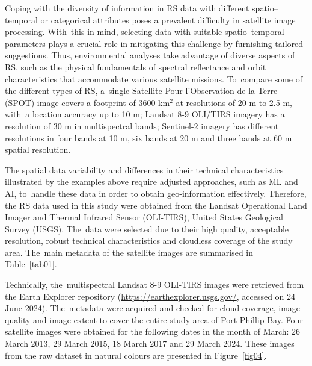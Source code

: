 \documentclass[jmse,article,accept,pdftex,oneauthor]{Definitions/mdpi}
\begin{document}
{Coping with the diversity of information in RS data with different spatio--temporal or categorical attributes poses a prevalent difficulty in satellite image processing. With~this in mind, selecting data with suitable spatio--temporal parameters plays a crucial role in mitigating this challenge by furnishing tailored suggestions. Thus, environmental analyses take advantage of diverse aspects of RS, such as the physical fundamentals of spectral reflectance and orbit characteristics that accommodate %
	various satellite missions. To~compare some of the different types of RS, %
	a~single %
	Satellite Pour l'Observation de la Terre (SPOT) image covers a footprint of} 3600 km$^2$ {at resolutions of 20 m to 2.5 m, with~a location accuracy up to 10 m; Landsat 8-9 OLI/TIRS imagery has a resolution of 30 m in multispectral bands; Sentinel-2 imagery has different resolutions in four bands at 10 m, six bands at 20 m and three bands at 60 m spatial resolution. }

{The spatial data variability and differences in their technical characteristics illustrated by the examples above require adjusted approaches, such as ML and AI, to~handle these data in order to obtain geo-information effectively. Therefore, }the RS data {used in this study }were obtained from the %
Landsat Operational Land Imager and Thermal Infrared Sensor (OLI-TIRS), United States Geological Survey (USGS){. The~data were selected due to their high quality, acceptable resolution, robust technical characteristics and cloudless coverage of the study area}. The~main metadata of the satellite images are summarised in Table~\ref{tab01}. 

Technically, the~multispectral Landsat 8-9 OLI-TIRS images were retrieved from the Earth Explorer repository (\href{https://earthexplorer.usgs.gov/}{https://earthexplorer.usgs.gov/}, accessed on 24 June 2024). The~metadata were acquired and checked for cloud coverage, image quality and image extent to cover the entire study area of Port Phillip Bay. Four satellite images were obtained for the following dates in {the month of }March: 26 March 2013, 29 March 2015, 18 March 2017 and 29 March 2024. These images %
from the raw dataset in natural colours are presented in Figure~\ref{fig04}.
\end{document}
